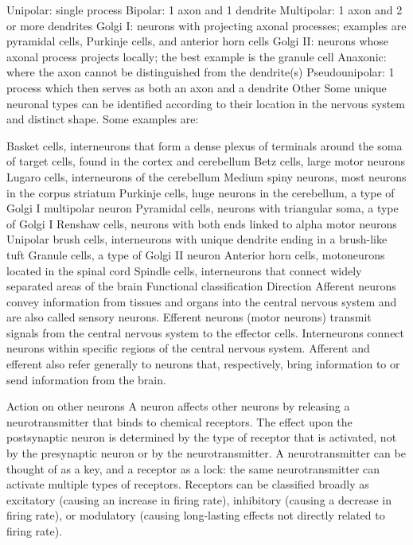 \documentclass[]{book}
\begin{document}
Unipolar: single process
Bipolar: 1 axon and 1 dendrite
Multipolar: 1 axon and 2 or more dendrites
Golgi I: neurons with projecting axonal processes; examples are pyramidal cells, Purkinje cells, and anterior horn cells
Golgi II: neurons whose axonal process projects locally; the best example is the granule cell
Anaxonic: where the axon cannot be distinguished from the dendrite(s)
Pseudounipolar: 1 process which then serves as both an axon and a dendrite
Other
Some unique neuronal types can be identified according to their location in the nervous system and distinct shape. Some examples are:

Basket cells, interneurons that form a dense plexus of terminals around the soma of target cells, found in the cortex and cerebellum
Betz cells, large motor neurons
Lugaro cells, interneurons of the cerebellum
Medium spiny neurons, most neurons in the corpus striatum
Purkinje cells, huge neurons in the cerebellum, a type of Golgi I multipolar neuron
Pyramidal cells, neurons with triangular soma, a type of Golgi I
Renshaw cells, neurons with both ends linked to alpha motor neurons
Unipolar brush cells, interneurons with unique dendrite ending in a brush-like tuft
Granule cells, a type of Golgi II neuron
Anterior horn cells, motoneurons located in the spinal cord
Spindle cells, interneurons that connect widely separated areas of the brain
Functional classification
Direction
Afferent neurons convey information from tissues and organs into the central nervous system and are also called sensory neurons.
Efferent neurons (motor neurons) transmit signals from the central nervous system to the effector cells.
Interneurons connect neurons within specific regions of the central nervous system.
Afferent and efferent also refer generally to neurons that, respectively, bring information to or send information from the brain.

Action on other neurons
A neuron affects other neurons by releasing a neurotransmitter that binds to chemical receptors. The effect upon the postsynaptic neuron is determined by the type of receptor that is activated, not by the presynaptic neuron or by the neurotransmitter. A neurotransmitter can be thought of as a key, and a receptor as a lock: the same neurotransmitter can activate multiple types of receptors. Receptors can be classified broadly as excitatory (causing an increase in firing rate), inhibitory (causing a decrease in firing rate), or modulatory (causing long-lasting effects not directly related to firing rate).
\end{document}
